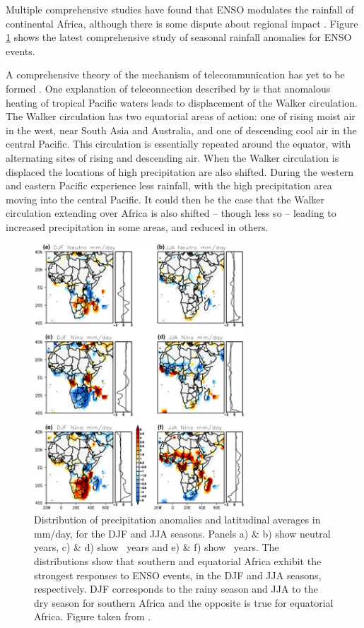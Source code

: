 Multiple comprehensive studies \citep{ropelewski1987, ropelewski1989,
  nicholson1996} have found that ENSO modulates the rainfall of continental
Africa, although there is some dispute about regional impact
\citep{wolter1989}. Figure \ref{fig:enso_rainfall_anoms} shows the latest
comprehensive study of seasonal rainfall anomalies for ENSO events.

A comprehensive theory of the mechanism of telecommunication has yet to be
formed \citep{philander1990}. One explanation of teleconnection described by
\cite{joly2009} is that anomalous heating of tropical Pacific waters leads to
displacement of the Walker circulation. The Walker circulation has two
equatorial areas of action: one of rising moist air in the west, near South Asia
and Australia, and one of descending cool air in the central Pacific. This
circulation is essentially repeated around the equator, with alternating sites
of rising and descending air. When the Walker circulation is displaced the
locations of high precipitation are also shifted. During \elnino{} the western
and eastern Pacific experience less rainfall, with the high precipitation area
moving into the central Pacific. It could then be the case that the Walker
circulation extending over Africa is also shifted -- though less so -- leading
to increased precipitation in some areas, and reduced in others.

\begin{figure}
  \centering
  \includegraphics[width=0.7\textwidth]{figures/enso_africa_rainfall_anoms}
  \caption{Distribution of precipitation anomalies and latitudinal averages in
    mm/day, for the DJF and JJA seasons. Panels a) \& b) show neutral years, c)
    \& d) show \elnino\ years and e) \& f) show \nina\ years. The distributions
    show that southern and equatorial Africa exhibit the strongest responses to
    ENSO events, in the DJF and JJA seasons, respectively. DJF corresponds to the
    rainy season and JJA to the dry season for southern Africa and the opposite
    is true for equatorial Africa. Figure taken from \cite{deoliveira2018}.}
  \label{fig:enso_rainfall_anoms}
\end{figure}

